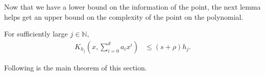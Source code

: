 \documentclass[a4paper,UKenglish,cleveref,autoref,thm-restate]{lipics-v2021}
\renewcommand{\dim}{{\mathrm{dim}}}
\begin{document}
Now that we have a lower bound on the information of the point, the next lemma helps get an upper bound on the complexity of the point on the polynomial. 
\begin{lemma}\label{lem:lessup}
	For sufficiently large $j\in\mathbb{N}$,
	\begin{align*} K_{h_j}\left(x,\sum_{i=0}^{d}a_ix^i\right)&\leq\left(s+\rho\right)h_j.
	\end{align*}
\end{lemma}
Following is the main theorem of this section. 
\maintheoremlow*
\end{document}
